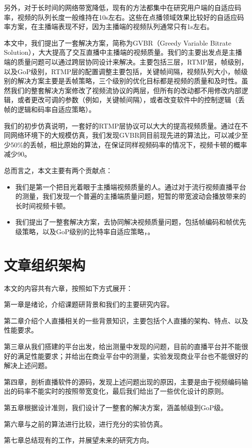 另外，对于长时间的网络带宽降低，现有的方法都集中在研究用户端的自适应码率，视频的队列长度一般维持在10s左右。这些在点播领域效果比较好的自适应码率方案，在主播端表现不好，因为主播端的视频队列通常只有1s左右。

本文中，我们提出了一套解决方案，简称为GVBR（Greedy Variable Bitrate Solution），大大提高了交互直播中主播端的视频质量。我们的主要出发点是主播端的质量问题可以通过跨层协同设计来解决。主要包括三层，RTMP层，帧级别，以及GoP级别，RTMP层的配置调整主要包括，关键帧间隔，视频队列大小，帧级别的解决方案主要是丢帧策略，三个级别的优化目标都是视频的质量和及时性。虽然我们的整套解决方案修改了视频流协议的两层，但所有的改动都不用修改内部逻辑，或者更改可调的参数（例如，关键帧间隔），或者改变软件中的控制逻辑（丢帧的逻辑和码率自适应策略）。

我们的初步仿真说明，一套好的RTMP层协议可以大大的提高视频质量。通过在不同网络环境下的大规模仿真，我们发现GVBR同目前现先进的算法比，可以减少至少50\%的丢帧，相比原始的算法，在保证同样视频码率的情况下，视频卡顿的概率减少90。

总而言之，本文主要有两个贡献点：
\begin{itemize}
  \item 我们是第一个把目光着眼于主播端视频质量的人。通过对于流行视频直播平台的测量，我们发现一个普遍的主播端质量问题，短暂的带宽波动会播放带来的长时间视频卡顿。
  \item 我们提出了一整套解决方案，去协同解决视频质量问题，包括帧编码和帧优先级策略，以及GoP级别的比特率自适应策略，。
\end{itemize}

\section{文章组织架构}
本文的内容共有六章，按照如下方式展开：

第一章是绪论，介绍课题研背景和我们的主要研究内容。

第二章介绍个人直播相关的一些背景知识，主要包括个人直播的架构、特点、以及性能要求。

第三章从我们搭建的平台出发，给出测量中发现的问题，目前的直播平台并不能很好的满足性能要求；并给出在商业平台中的测量，实验发现商业平台也不能很好的解决上述问题。

第四章，剖析直播软件的源码，发现上述问题出现的原因，主要是由于视频编码输出的码率不能实时的按照带宽变化，最后我们给出了一些优化设计的原则。

第五章根据设计准则，我们设计了一整套的解决方案，涵盖帧级到GoP级。

第六章与之前的算法进行比较，进行充分的实验仿真。

第七章总结现有的工作，并展望未来的研究方向。

